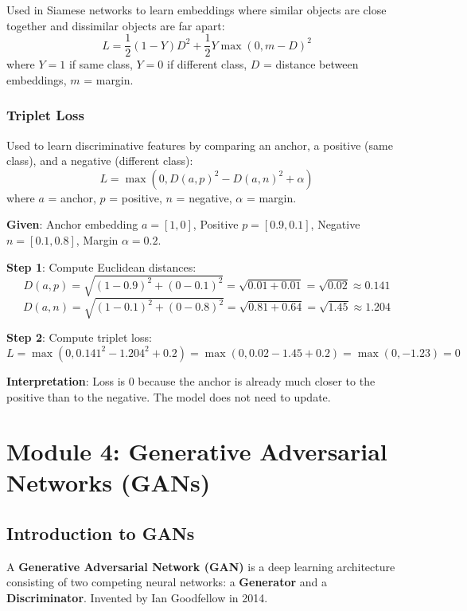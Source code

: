 \documentclass[11pt,a4paper]{article}
\begin{document}
Used in Siamese networks to learn embeddings where similar objects are close together and dissimilar objects are far apart:
\[
L = \frac{1}{2} (1 - Y) D^2 + \frac{1}{2} Y \max(0, m - D)^2
\]
where $Y = 1$ if same class, $Y = 0$ if different class, $D$ = distance between embeddings, $m$ = margin.

\subsubsection{Triplet Loss}

Used to learn discriminative features by comparing an anchor, a positive (same class), and a negative (different class):
\[
L = \max(0, D(a, p)^2 - D(a, n)^2 + \alpha)
\]
where $a$ = anchor, $p$ = positive, $n$ = negative, $\alpha$ = margin.

\begin{tcolorbox}[colback=yellow!5!white,colframe=yellow!75!black,title=\textbf{Worked Example 11: Triplet Loss Calculation}]
\textbf{Given}: Anchor embedding $a = [1, 0]$, Positive $p = [0.9, 0.1]$, Negative $n = [0.1, 0.8]$, Margin $\alpha = 0.2$.

\textbf{Step 1}: Compute Euclidean distances:
\[
D(a,p) = \sqrt{(1-0.9)^2 + (0-0.1)^2} = \sqrt{0.01 + 0.01} = \sqrt{0.02} \approx 0.141
\]
\[
D(a,n) = \sqrt{(1-0.1)^2 + (0-0.8)^2} = \sqrt{0.81 + 0.64} = \sqrt{1.45} \approx 1.204
\]

\textbf{Step 2}: Compute triplet loss:
\[
L = \max(0, 0.141^2 - 1.204^2 + 0.2) = \max(0, 0.02 - 1.45 + 0.2) = \max(0, -1.23) = 0
\]

\textbf{Interpretation}: Loss is 0 because the anchor is already much closer to the positive than to the negative. The model does not need to update.
\end{tcolorbox}

\newpage

\section{Module 4: Generative Adversarial Networks (GANs)}

\subsection{Introduction to GANs}

A \textbf{Generative Adversarial Network (GAN)} is a deep learning architecture consisting of two competing neural networks: a \textbf{Generator} and a \textbf{Discriminator}. Invented by Ian Goodfellow in 2014.
\end{document}
